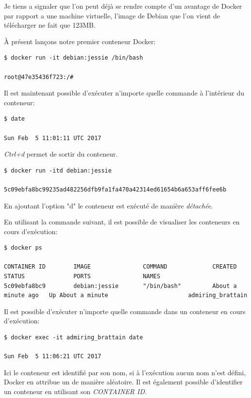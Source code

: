 Je tiens a signaler que l'on peut déjà se rendre compte d'un avantage de Docker par rapport a une machine virtuelle, l'image de Debian que l'on vient de télécharger ne fait que 123MB.

À présent lançons notre premier conteneur Docker:

\begin{lstlisting}[frame=single]
$ docker run -it debian:jessie /bin/bash

root@47e35436f723:/# 
\end{lstlisting}

Il est maintenant possible d'exécuter n’importe quelle commande à l'intérieur du conteneur:

\begin{lstlisting}[frame=single]
$ date

Sun Feb  5 11:01:11 UTC 2017
\end{lstlisting}

\emph{Ctrl+d} permet de sortir du conteneur.

\begin{lstlisting}[frame=single]
$ docker run -itd debian:jessie

5c09ebfa8bc99235ad482256dfb9fa1fa470a42314ed61654b6a653aff6fee6b
\end{lstlisting}

En ajoutant l'option "d" le conteneur est exécuté de manière \emph{détachée}.

En utilisant la commande suivant, il est possible de visualiser les conteneurs en cours d'exécution:

\begin{lstlisting}[frame=single]
$ docker ps

CONTAINER ID        IMAGE               COMMAND             CREATED              STATUS              PORTS               NAMES
5c09ebfa8bc9        debian:jessie       "/bin/bash"         About a minute ago   Up About a minute                       admiring_brattain
\end{lstlisting}

Il est possible d'exécuter n’importe quelle commande dans un conteneur en cours d'exécution:

\begin{lstlisting}[frame=single]
$ docker exec -it admiring_brattain date

Sun Feb  5 11:06:21 UTC 2017
\end{lstlisting}

Ici le conteneur est identifié par son nom, si à l'exécution aucun nom n'est défini, Docker en attribue un de manière aléatoire. Il est également possible d'identifier un conteneur en utilisant son \emph{CONTAINER ID}.

